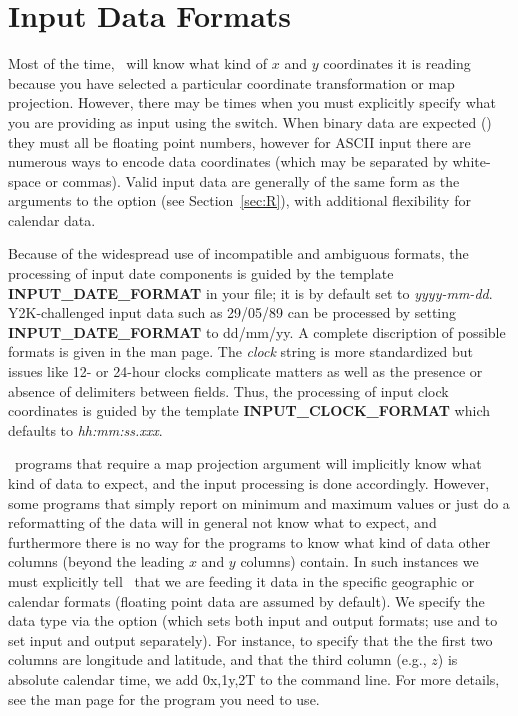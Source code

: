 \section{Input Data Formats}
\label{sec:io}

Most of the time, \GMT\ will know what kind of $x$ and $y$ coordinates it is reading because you have selected
a particular coordinate transformation or map projection.  However,
there may be times when you must explicitly specify what you are
providing as input using the  switch. When binary data are expected () they must all
be floating point numbers, however for ASCII input there are numerous
ways to encode data coordinates (which may be separated by white-space or commas).  Valid input data are generally
of the same form as the arguments to the  option (see Section~\ref{sec:R}), with additional
flexibility for calendar data.

Because of the widespread use of incompatible and ambiguous formats, the processing of input
date components is guided by the template {\bf INPUT\_DATE\_FORMAT} in your
 file; it is by default set to {\it yyyy-mm-dd}.  Y2K-challenged input data such as 29/05/89 can be processed by setting {\bf INPUT\_DATE\_FORMAT}
to dd/mm/yy.  A complete discription of possible formats is given in the 
man page.  The {\it clock} string is more standardized but issues like 12- or 24-hour clocks complicate matters
as well as the presence or absence of delimiters between fields.  Thus, the processing of input
clock coordinates is guided by the template {\bf INPUT\_CLOCK\_FORMAT} which defaults to {\it hh:mm:ss.xxx}.

\GMT\ programs that require a map projection argument will implicitly know what kind of data to expect, and the
input processing is done accordingly.  However, some programs that simply report on minimum and maximum
values or just do a reformatting of the data will in general not know what to expect, and furthermore there is
no way for the programs to know what kind of data other columns (beyond the leading $x$ and $y$ columns) contain.
In such instances we must
explicitly tell \GMT\ that we are feeding it data in the specific geographic or calendar formats (floating point
data are assumed by default).  We specify the data type via the  option (which sets both input and output
formats; use  and  to set input and output separately).  For instance, to specify that the
the first two columns are longitude and latitude, and that the third column (e.g., $z$) is absolute calendar time, we add
0x,1y,2T to the command line.  For more details, see the man page for the program you need to use.

